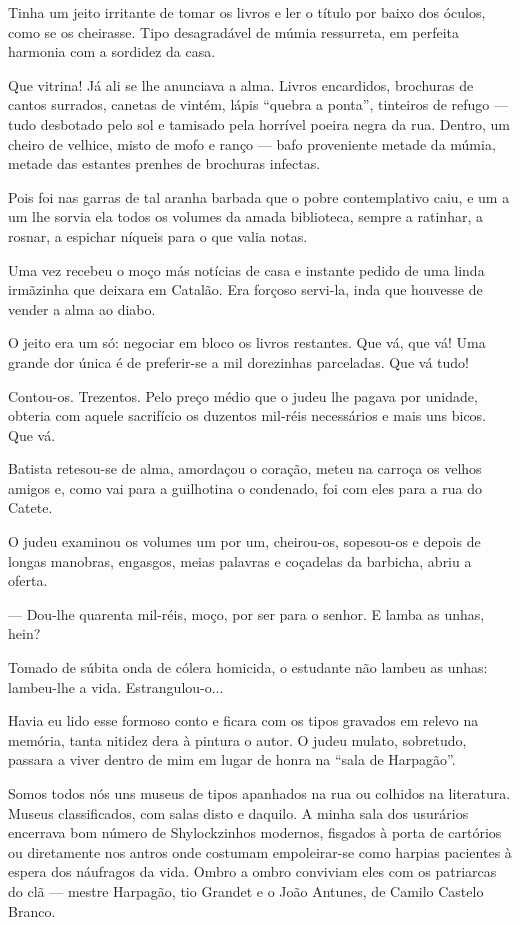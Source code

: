 Tinha um jeito irritante de tomar os livros e ler o título por baixo dos
óculos, como se os cheirasse. Tipo desagradável de múmia ressurreta, em
perfeita harmonia com a sordidez da casa.

Que vitrina! Já ali se lhe anunciava a alma. Livros encardidos,
brochuras de cantos surrados, canetas de vintém, lápis ``quebra a
ponta'', tinteiros de refugo --- tudo desbotado pelo sol e tamisado pela
horrível poeira negra da rua. Dentro, um cheiro de velhice, misto de
mofo e ranço --- bafo proveniente metade da múmia, metade das estantes
prenhes de brochuras infectas.

Pois foi nas garras de tal aranha barbada que o pobre contemplativo
caiu, e um a um lhe sorvia ela todos os volumes da amada biblioteca,
sempre a ratinhar, a rosnar, a espichar níqueis para o que valia notas.

Uma vez recebeu o moço más notícias de casa e instante pedido de uma
linda irmãzinha que deixara em Catalão. Era forçoso servi-la, inda que
houvesse de vender a alma ao diabo.

O jeito era um só: negociar em bloco os livros restantes. Que vá, que
vá! Uma grande dor única é de preferir-se a mil dorezinhas parceladas.
Que vá tudo!

Contou-os. Trezentos. Pelo preço médio que o judeu lhe pagava por
unidade, obteria com aquele sacrifício os duzentos mil-réis necessários
e mais uns bicos. Que vá.

Batista retesou-se de alma, amordaçou o coração, meteu na carroça os
velhos amigos e, como vai para a guilhotina o condenado, foi com eles
para a rua do Catete.

O judeu examinou os volumes um por um, cheirou-os, sopesou-os e depois
de longas manobras, engasgos, meias palavras e coçadelas da barbicha,
abriu a oferta.

--- Dou-lhe quarenta mil-réis, moço, por ser para o senhor. E lamba as
unhas, hein?

Tomado de súbita onda de cólera homicida, o estudante não lambeu as
unhas: lambeu-lhe a vida. Estrangulou-o...

Havia eu lido esse formoso conto e ficara com os tipos gravados em
relevo na memória, tanta nitidez dera à pintura o autor. O judeu mulato,
sobretudo, passara a viver dentro de mim em lugar de honra na ``sala de
Harpagão''.

Somos todos nós uns museus de tipos apanhados na rua ou colhidos na
literatura. Museus classificados, com salas disto e daquilo. A minha
sala dos usurários encerrava bom número de Shylockzinhos modernos,
fisgados à porta de cartórios ou diretamente nos antros onde costumam
empoleirar-se como harpias pacientes à espera dos náufragos da vida.
Ombro a ombro conviviam eles com os patriarcas do clã --- mestre
Harpagão, tio Grandet e o João Antunes, de Camilo Castelo Branco.

